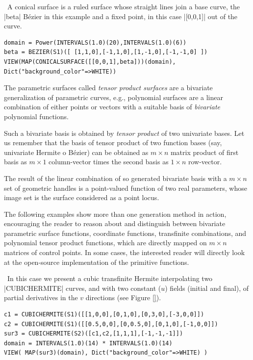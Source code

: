 \begin{coding}[Algebraic computation of FE = $\delta_1$]
\begin{condition}\
A conical surface is a ruled surface whose straight lines join a base curve, the |beta| Bézier in this example and a fixed point, in this case |[0,0,1]| out of the curve.
\begin{lstlisting}[language=JuliaLocal, style=julia, mathescape=true]
domain = Power(INTERVALS(1.0)(20),INTERVALS(1.0)(6))
beta = BEZIER(S1)([ [1,1,0],[-1,1,0],[1,-1,0],[-1,-1,0] ])
VIEW(MAP(CONICALSURFACE([[0,0,1],beta]))(domain), Dict("background_color"=>WHITE))
\end{lstlisting}
\end{condition}

\begin{definition}
The parametric surfaces called \emph{tensor product surfaces} are a
bivariate generalization of parametric curves, e.g., 
polynomial surfaces are a linear combination of either points or
vectors with a suitable basis of \emph{bivariate} polynomial
functions.  
\end{definition}
Such a bivariate basis is obtained by \emph{tensor product}
of two univariate bases.  Let us remember that the basis of tensor product of two function bases (say, univariate Hermite o Bézier) can be obtained as $m\times n$ matrix product of first basis as $m\times 1$ column-vector times the second basis as $1\times n$ row-vector. 

The result of the linear combination of so generated 
bivariate basis with a $m\times n$ set of geometric handles is a point-valued
function of two real parameters, whose image set is the surface
considered as a point locus. 
 
The following examples show more than one generation method in action, encouraging the reader to reason about and distinguish between bivariate parametric surface functions, coordinate functions, transfinite combinations, and polynomial tensor product functions, which are directly mapped on $ m \times n$ matrices of control points. In some cases, the interested reader will directly look at the open-source implementation of the primitive functions.

\begin{condition}[Transfinite Hermite surface]\
In this case we present a cubic transfinite Hermite interpolating two |CUBICHERMITE| curves, and with two constant ($u$) fields (initial and final), of partial derivatives in the $v$ directions (see Figure \ref{}).
 \begin{lstlisting}[language=JuliaLocal, style=julia, mathescape=true]
c1 = CUBICHERMITE(S1)([[1,0,0],[0,1,0],[0,3,0],[-3,0,0]])
c2 = CUBICHERMITE(S1)([[0.5,0,0],[0,0.5,0],[0,1,0],[-1,0,0]])
sur3 = CUBICHERMITE(S2)([c1,c2,[1,1,1],[-1,-1,-1]])
domain = INTERVALS(1.0)(14) * INTERVALS(1.0)(14)
VIEW( MAP(sur3)(domain), Dict("background_color"=>WHITE) )
\end{lstlisting}
\end{condition}



\end{coding}
